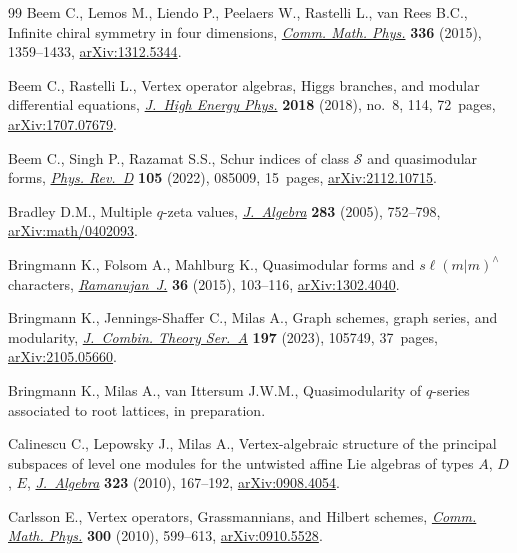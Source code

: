 \documentclass[10pt,a4paper]{amsart}
\numberwithin{equation}{section}
\theoremstyle{definition}
\begin{document}
\begin{thebibliography}{99}
Beem C., Lemos M., Liendo P., Peelaers W., Rastelli L., van Rees B.C., Infinite
 chiral symmetry in four dimensions,
 \href{https://doi.org/10.1007/s00220-014-2272-x}{\textit{Comm. Math. Phys.}}
 \textbf{336} (2015), 1359--1433,
 \href{https://arxiv.org/abs/1312.5344}{arXiv:1312.5344}.

Beem C., Rastelli L., Vertex operator algebras, {H}iggs branches, and modular
 differential equations,
 \href{https://doi.org/10.1007/jhep08(2018)114}{\textit{J.~High Energy Phys.}}
 \textbf{2018} (2018), no.~8, 114, 72~pages,
 \href{https://arxiv.org/abs/1707.07679}{arXiv:1707.07679}.

Beem C., Singh P., Razamat S.S., Schur indices of class {$\mathcal{S}$} and
 quasimodular forms,
 \href{https://doi.org/10.1103/physrevd.105.085009}{\textit{Phys. Rev.~D}}
 \textbf{105} (2022), 085009, 15~pages,
 \href{https://arxiv.org/abs/2112.10715}{arXiv:2112.10715}.

Bradley D.M., Multiple {$q$}-zeta values,
 \href{https://doi.org/10.1016/j.jalgebra.2004.09.017}{\textit{J.~Algebra}}
 \textbf{283} (2005), 752--798,
 \href{https://arxiv.org/abs/math/0402093}{arXiv:math/0402093}.

Bringmann K., Folsom A., Mahlburg K., Quasimodular forms and
 {$s\ell(m|m)^\wedge$} characters,
 \href{https://doi.org/10.1007/s11139-014-9621-4}{\textit{Ramanujan~J.}}
 \textbf{36} (2015), 103--116,
 \href{https://arxiv.org/abs/1302.4040}{arXiv:1302.4040}.

Bringmann K., Jennings-Shaffer C., Milas A., Graph schemes, graph series, and
 modularity,
 \href{https://doi.org/10.1016/j.jcta.2023.105749}{\textit{J.~Combin. Theory
 Ser.~A}} \textbf{197} (2023), 105749, 37~pages,
 \href{https://arxiv.org/abs/2105.05660}{arXiv:2105.05660}.

Bringmann K., Milas A., van Ittersum J.W.M., Quasimodularity  of $q$-series associated to root lattices, {i}n preparation.

Calinescu C., Lepowsky J., Milas A., Vertex-algebraic structure of the
 principal subspaces of level one modules for the untwisted affine {L}ie
 algebras of types {$A$, $D$, $E$},
 \href{https://doi.org/10.1016/j.jalgebra.2009.09.029}{\textit{J.~Algebra}}
 \textbf{323} (2010), 167--192,
 \href{https://arxiv.org/abs/0908.4054}{arXiv:0908.4054}.

Carlsson E., Vertex operators, {G}rassmannians, and {H}ilbert schemes,
 \href{https://doi.org/10.1007/s00220-010-1123-7}{\textit{Comm. Math. Phys.}}
 \textbf{300} (2010), 599--613,
 \href{https://arxiv.org/abs/0910.5528}{arXiv:0910.5528}.


\end{thebibliography}
\end{document}
